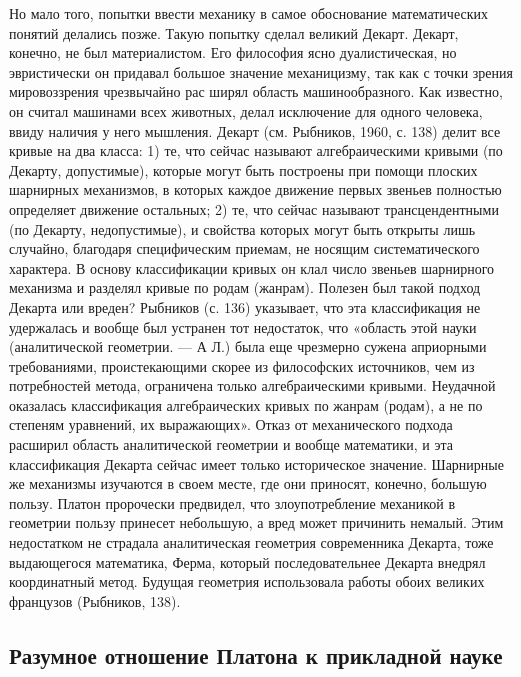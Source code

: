 Но мало того, попытки ввести механику в самое обоснование
математических понятий делались позже. Такую попытку сделал великий
Декарт. Декарт, конечно, не был материалистом. Его философия ясно
дуалистическая, но эвристически он придавал большое значение
механицизму, так как с точки зрения мировоззрения чрезвычайно рас
ширял область машинообразного. Как известно, он считал машинами всех
животных, делал исключение для одного человека, ввиду наличия у него
мышления. Декарт (см. Рыбников, 1960, с. 138) делит все кривые на два
класса: 1) те, что сейчас называют алгебраическими кривыми (по
Декарту, допустимые), которые могут быть построены при помощи плоских
шарнирных механизмов, в которых каждое движение первых звеньев
полностью определяет движение остальных; 2) те, что сейчас называют
трансцендентными (по Декарту, недопустимые), и свойства которых могут
быть открыты лишь случайно, благодаря специфическим приемам, не
носящим систематического характера. В основу классификации кривых он
клал число звеньев шарнирного механизма и разделял кривые по родам
(жанрам). Полезен был такой подход Декарта или вреден? Рыбников (с.
136) указывает, что эта классификация не удержалась и вообще был
устранен тот недостаток, что «область этой науки (аналитической
геометрии. --- А Л.) была еще чрезмерно сужена априорными
требованиями, проистекающими скорее из философских источников, чем из
потребностей метода, ограничена только алгебраическими кривыми.
Неудачной оказалась классификация алгебраических кривых по жанрам
(родам), а не по степеням уравнений, их выражающих». Отказ от
механического подхода расширил область аналитической геометрии и
вообще математики, и эта классификация Декарта сейчас имеет только
историческое значение. Шарнирные же механизмы изучаются в своем
месте, где они приносят, конечно, большую пользу. Платон пророчески
предвидел, что злоупотребление механикой в геометрии пользу принесет
небольшую, а вред может причинить немалый. Этим недостатком не
страдала аналитическая геометрия современника Декарта, тоже
выдающегося математика, Ферма, который последовательнее Декарта
внедрял координатный метод. Будущая геометрия использовала работы
обоих великих французов (Рыбников, 138).

\subsection{Разумное отношение Платона к прикладной науке}

